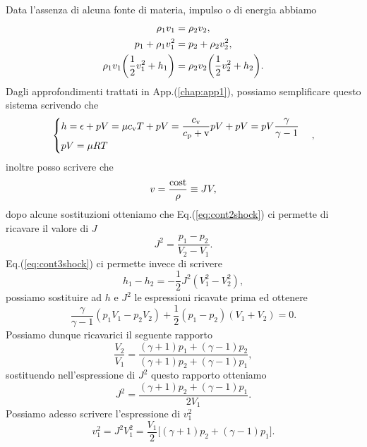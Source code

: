 Data l'assenza di alcuna fonte di materia, impulso o di energia abbiamo
\begin{gather}
    \rho_1 v_1 = \rho_2 v_2,\notag \\
    p_1 + \rho_1 v_1^2 = p_2 + \rho_2 v_2^2, \label{eq:cont2shock}\\
    \rho_1 v_1 \biggl( \frac{1}{2}v_1^2 + h_1 \biggr) = \rho_2 v_2 \biggl( \frac{1}{2}v_2^2 + h_2 \biggr).\label{eq:cont3shock}
\end{gather}
Dagli approfondimenti trattati in App.(\ref{chap:app1}), possiamo semplificare questo sistema scrivendo che
\begin{equation*}
    \begin{cases}
        \displaystyle h = \epsilon + pV = \mu c_\textup{v} T + pV= \frac{c_\textup{v}}{c_\textup{p} + \textup{v}} pV + pV = pV \frac{\gamma}{\gamma - 1}\\
        pV = \mu R T 
    \end{cases},
\end{equation*}
inoltre posso scrivere che 
\begin{equation*}
    v = \frac{\textup{cost}}{\rho} \equiv J V,
\end{equation*}
dopo alcune sostituzioni otteniamo che Eq.(\ref{eq:cont2shock}) ci permette di ricavare il valore di $J$
\begin{equation*}
    J^2 = \frac{p_1 - p_2}{V_2 - V_1}.
\end{equation*}
Eq.(\ref{eq:cont3shock}) ci permette invece di scrivere
\begin{equation*}
    h_1 - h_2 = -\frac{1}{2}J^2(V_1^2 - V_2^2),
\end{equation*}
possiamo sostituire ad $h$ e $J^2$ le espressioni ricavate prima ed ottenere
\begin{equation*}
    \frac{\gamma}{\gamma - 1} (p_1 V_1 - p_2 V_2) + \frac{1}{2}(p_1 - p_2)(V_1 + V_2) = 0.
\end{equation*}
Possiamo dunque ricavarici il seguente rapporto
\begin{equation}
    \frac{V_2}{V_1} = \frac{(\gamma + 1)p_1 + (\gamma - 1)p_2}{(\gamma + 1)p_2 + (\gamma - 1)p_1},\label{eq:V2fracV1}
\end{equation}
sostituendo nell'espressione di $J^2$ questo rapporto otteniamo
\begin{equation*}
    J^2 = \frac{(\gamma + 1)p_2 + (\gamma - 1)p_1}{2V_1}.
\end{equation*}
Possiamo adesso scrivere l'espressione di $v_1^2$
\begin{equation}
    v_1^2 = J^2 V_1^2 = \frac{V_1}{2}\bigl[ (\gamma + 1)p_2 + (\gamma - 1)p_1 \bigr].\label{eq:v_1^2}
\end{equation}
